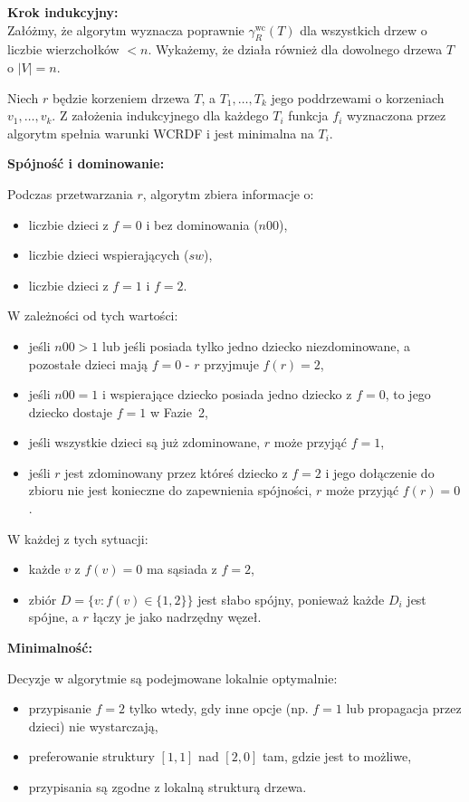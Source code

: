 \textbf{Krok indukcyjny:}\\ 
Załóżmy, że algorytm wyznacza poprawnie $\gamma_R^{\text{wc}}(T)$ dla wszystkich drzew o liczbie wierzchołków $< n$. Wykażemy, że działa również dla dowolnego drzewa $T$ o $|V| = n$.

Niech $r$ będzie korzeniem drzewa $T$, a $T_1, \dots, T_k$ jego poddrzewami o korzeniach $v_1, \dots, v_k$. Z założenia indukcyjnego dla każdego $T_i$ funkcja $f_i$ wyznaczona przez algorytm spełnia warunki WCRDF i jest minimalna na $T_i$.

\textbf{Spójność i dominowanie:}

Podczas przetwarzania $r$, algorytm zbiera informacje o:
\begin{itemize}
\item liczbie dzieci z $f=0$ i bez dominowania ($n00$),
\item liczbie dzieci wspierających ($sw$),
\item liczbie dzieci z $f=1$ i $f=2$.
\end{itemize}

W zależności od tych wartości:
\begin{itemize}
\item jeśli $n00 > 1$ lub jeśli posiada tylko jedno dziecko niezdominowane, a pozostałe dzieci mają $f = 0$ - $r$ przyjmuje $f(r) = 2$,
\item jeśli $n00 = 1$ i wspierające dziecko posiada jedno dziecko z $f=0$, to jego dziecko dostaje $f=1$ w Fazie~2,
\item jeśli wszystkie dzieci są już zdominowane, $r$ może przyjąć $f = 1$,
\item jeśli $r$ jest zdominowany przez któreś dziecko z $f = 2$ i jego dołączenie do zbioru nie jest konieczne do zapewnienia spójności, $r$ może przyjąć $f(r) = 0$.
\end{itemize}

W każdej z tych sytuacji:
\begin{itemize}
\item każde $v$ z $f(v)=0$ ma sąsiada z $f=2$,
\item zbiór $D = \{v : f(v) \in \{1,2\}\}$ jest słabo spójny, ponieważ każde $D_i$ jest spójne, a $r$ łączy je jako nadrzędny węzeł.
\end{itemize}

\textbf{Minimalność:}

Decyzje w algorytmie są podejmowane lokalnie optymalnie:
\begin{itemize}
\item przypisanie $f = 2$ tylko wtedy, gdy inne opcje (np. $f=1$ lub propagacja przez dzieci) nie wystarczają,
\item preferowanie struktury $[1,1]$ nad $[2,0]$ tam, gdzie jest to możliwe,
\item przypisania są zgodne z lokalną strukturą drzewa.
\end{itemize}

